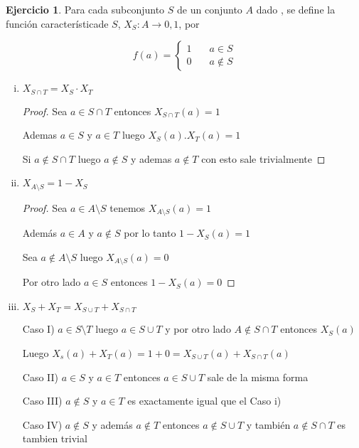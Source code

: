 \documentclass[12pt]{article}
\newcommand{\ra}{\rightarrow}
\theoremstyle{definition}
\newtheorem{ej}{Ejercicio}
\begin{document}
\begin{ej}

Para cada subconjunto $S$ de un conjunto $A$ dado , se define la función característicade $S$, $X_{S}: A \ra {0,1}$, por 


$$
f(a) = \left\{
        \begin{array}{ll}
            1 & \quad a \in S \\
            0 & \quad a \notin S
        \end{array}
    \right.
$$
\begin{enumerate}[i.]
  
  \item $X_{S \cap T} = X_{S} \cdot  X_{T} $
    \begin{proof}
      Sea $a \in S \cap T$ entonces $X_{S \cap T}(a) = 1$

      Ademas $a \in S$ y $a \in T$ luego $X_{S}(a).X_{T}(a) = 1$

      Si $a \notin S \cap T$ luego $a \notin S$ y ademas $a \notin T$ con esto sale trivialmente
    \end{proof}

  \item $X_{A \setminus S} = 1 - X_{S}$
    \begin{proof}
      Sea $a \in A \setminus S$ tenemos $X_{A \setminus S}(a) = 1$

      Además $a \in A$ y $a \notin S$ por lo tanto $1 - X_{S}(a) = 1$

      Sea $a \notin A \setminus S$ luego $X_{A \setminus S}(a) = 0$

      Por otro lado $a \in S$ entonces $1 - X_{S}(a) = 0$
    \end{proof}

  \item $X_{S} + X_{T} = X_{S \cup T} + X_{S \cap T}$ 

    Caso I) $a \in S \setminus T$ luego $a \in S \cup T$ y por otro lado $A \notin S \cap T $ entonces $X_{S}(a) $

    Luego $X_{s}(a) + X_{T}(a) = 1 + 0 = X_{S \cup T}(a) + X_{S \cap T}(a)$

    Caso II)  $a \in S $ y $a \in T$ entonces $a \in S \cup T$ sale de la misma forma
    
    Caso III) $a \notin S$ y $a \in T$ es exactamente igual que el Caso i)
    
    Caso IV) $a \notin S$ y además $a \notin T$ entonces $a \notin S \cup T$ y también $a \notin S \cap T$ es tambien trivial
\end{enumerate}
\end{ej}
\end{document}
